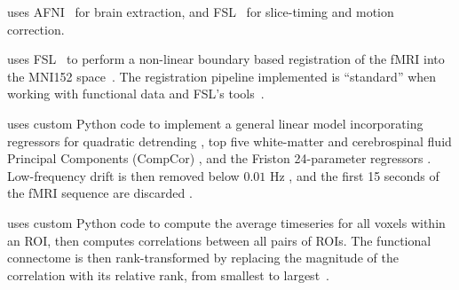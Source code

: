 \documentclass[11pt]{article}
\begin{document}
\begin{multicols}{2}
\begin{description}[style=unboxed,leftmargin=0cm]
        \item[Preprocessing] uses AFNI~\cite{AFNI}  for brain extraction, and FSL~\cite{Jenkinson2002,Woolrich2009} for slice-timing and motion correction. 
        \item[Registration] uses FSL~\cite{fsl1, Greve2009,Andersson2007}  to perform a non-linear boundary based registration of the fMRI into the MNI152 space~\cite{mni152}. 
The registration pipeline implemented is ``standard'' when working with functional data and FSL's tools~\cite{cpac}.
\item[Nuisance Correction] uses custom Python code to implement a general linear model incorporating regressors for quadratic detrending \cite{Tanabe, Smith1999}, top five white-matter and cerebrospinal fluid Principal Components (CompCor) \cite{Behzadi2007,Ciric2017174}, and the Friston 24-parameter regressors \cite{Friston1996}. Low-frequency drift is then removed below $0.01$ Hz \cite{Lindquist2009}, and the first 15 seconds of the fMRI sequence are discarded \cite{Bright2016}. 
\item[Graph Generation] uses custom Python code to compute the average timeseries for all voxels within an ROI, then computes correlations between all pairs of ROIs. 
The functional connectome is then rank-transformed by replacing the magnitude of the correlation with its relative rank, from smallest to largest~\cite{discriminability}.  
\end{description}



\end{multicols}
\end{document}

